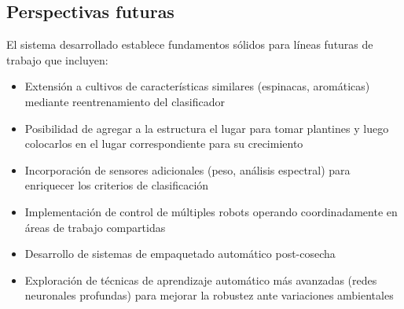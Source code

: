 \subsection*{Perspectivas futuras}

El sistema desarrollado establece fundamentos sólidos para líneas futuras de trabajo que incluyen:

\begin{itemize}
    \item Extensión a cultivos de características similares (espinacas, aromáticas) mediante reentrenamiento del clasificador
    \item Posibilidad de agregar a la estructura el lugar para tomar plantines y luego colocarlos en el lugar correspondiente para su crecimiento
    \item Incorporación de sensores adicionales (peso, análisis espectral) para enriquecer los criterios de clasificación
    \item Implementación de control de múltiples robots operando coordinadamente en áreas de trabajo compartidas
    \item Desarrollo de sistemas de empaquetado automático post-cosecha
    \item Exploración de técnicas de aprendizaje automático más avanzadas (redes neuronales profundas) para mejorar la robustez ante variaciones ambientales
\end{itemize}